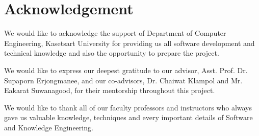 \chapter*{Acknowledgement}
\label{chap:acknowledgement}

We would like to acknowledge the support of Department of Computer Engineering, Kasetsart University for providing us all
software development and technical knowledge and also the opportunity to prepare the project.

We would like to express our deepest gratitude to our advisor, Asst. Prof. Dr. Supaporn Erjongmanee, and our co-advisors, Dr. Chaiwat Klampol and Mr. Eakarat Suwanagood, for their mentorship throughout this project.

We would like to thank all of our faculty professors and instructors who always gave us valuable knowledge, techniques and
every important details of Software and Knowledge Engineering.

\vspace{.2in}
\begin{flushright}
    \usevar{\srsAuthorOne} \\
    \usevar{\srsAuthorTwo} \\
    \usevar{\srsAuthorThree}
\end{flushright}
